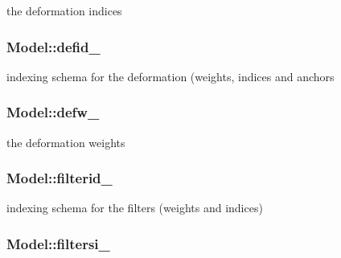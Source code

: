 the deformation indices 

\hypertarget{class_model_a381f13c9035313ffd1cb67e07a2e84bd}{
\subsubsection[{defid\-\_\-}]{ Model\-::defid\-\_\-\hspace{0.3cm}{\ttfamily [protected]}}}\label{class_model_a381f13c9035313ffd1cb67e07a2e84bd}


indexing schema for the deformation (weights, indices and anchors 

\hypertarget{class_model_a1e1fba557437a9f4c0ef1535a64d83f2}{
\subsubsection[{defw\-\_\-}]{ Model\-::defw\-\_\-\hspace{0.3cm}{\ttfamily [protected]}}}\label{class_model_a1e1fba557437a9f4c0ef1535a64d83f2}


the deformation weights 

\hypertarget{class_model_a08e65111230ab010535cc9485dfd6d0d}{
\subsubsection[{filterid\-\_\-}]{ Model\-::filterid\-\_\-\hspace{0.3cm}{\ttfamily [protected]}}}\label{class_model_a08e65111230ab010535cc9485dfd6d0d}


indexing schema for the filters (weights and indices) 

\hypertarget{class_model_ab3f13d90cc96c70d4b454db12528f85f}{
\subsubsection[{filtersi\-\_\-}]{ Model\-::filtersi\-\_\-\hspace{0.3cm}{\ttfamily [protected]}}}\label{class_model_ab3f13d90cc96c70d4b454db12528f85f}


